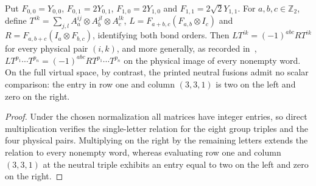 \begin{lemma}
    \label{thm:asymex_czy_supported_associativity}
    \leanok
    Put $F_{0,0}=Y_{0,0}$, $F_{0,1}=2Y_{0,1}$,
    $F_{1,0}=2Y_{1,0}$ and $F_{1,1}=2\sqrt2Y_{1,1}$.
    For $a,b,c\in\mathbb Z_2$, define
    $T^{ik}=\sum_{j,l}A_a^{ij}\otimes A_b^{jl}\otimes A_c^{lk}$,
    $L=F_{a+b,c}(F_{a,b}\otimes I_c)$ and
    $R=F_{a,b+c}(I_a\otimes F_{b,c})$, identifying both bond orders.
    Then $LT^{ik}=(-1)^{abc}RT^{ik}$ for every physical pair $(i,k)$,
    and more generally, as recorded in~\cite{gap:lmsvkl25_czy_associator},
    $LT^{p_1}\cdots T^{p_n}=(-1)^{abc}RT^{p_1}\cdots T^{p_n}$ on the
    physical image of every nonempty word.
    On the full virtual space, by contrast, the printed neutral fusions
    admit no scalar comparison: the entry in row one and column $(3,3,1)$
    is two on the left and zero on the right.
\end{lemma}

\begin{proof}
    \leanok
    Under the chosen normalization all matrices have integer entries, so
    direct multiplication verifies the single-letter relation for the
    eight group triples and the four physical pairs. Multiplying on the
    right by the remaining letters extends the relation to every nonempty
    word, whereas evaluating row one and column $(3,3,1)$ at the neutral
    triple exhibits an entry equal to two on the left and zero on the
    right.
\end{proof}
